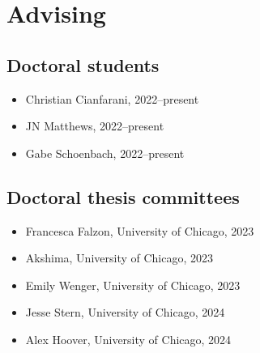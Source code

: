 

\newcommand{\cvadvisor}[1]{\item {#1}}

\section{Advising}

\subsection{Doctoral students}
\begin{itemize}[label={}, nosep]
  \cvadvisor{Christian Cianfarani, 2022--present}
  \cvadvisor{JN Matthews, 2022--present}
  \cvadvisor{Gabe Schoenbach, 2022--present}
\end{itemize}

\subsection{Doctoral thesis committees}
\begin{itemize}[label={}, nosep]
    \cvadvisor{Francesca Falzon, University of Chicago, 2023}
    \cvadvisor{Akshima, University of Chicago, 2023}
    \cvadvisor{Emily Wenger, University of Chicago, 2023}
    \cvadvisor{Jesse Stern, University of Chicago, 2024}
    \cvadvisor{Alex Hoover, University of Chicago, 2024}
\end{itemize}

